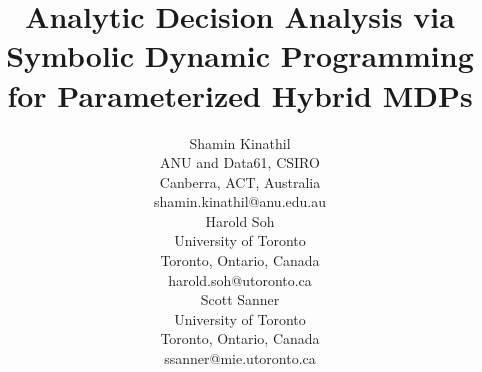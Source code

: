 \title{Analytic Decision Analysis via Symbolic Dynamic Programming for Parameterized Hybrid MDPs}

\author{Shamin Kinathil \\
ANU and Data61, CSIRO \\
Canberra, ACT, Australia \\
shamin.kinathil@anu.edu.au \\
\And
Harold Soh \\
University of Toronto \\
Toronto, Ontario, Canada \\
harold.soh@utoronto.ca \\
\And
Scott Sanner  \\
University of Toronto \\
Toronto, Ontario, Canada \\
ssanner@mie.utoronto.ca \\
}

\maketitle